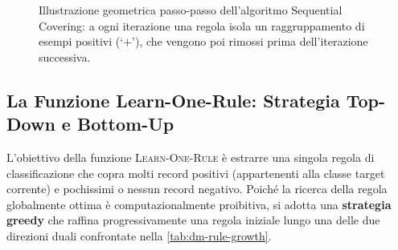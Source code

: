 \begin{figure}[H]
{%
}
\caption{Illustrazione geometrica passo-passo dell'algoritmo Sequential Covering: a ogni iterazione una regola isola un raggruppamento di esempi positivi (`$+$'), che vengono poi rimossi prima dell'iterazione successiva.}
\label{fig:dm-seq-covering}
\end{figure}

\FloatBarrier
\subsection{La Funzione Learn-One-Rule: Strategia Top-Down e Bottom-Up}
\label{subsec:dm-learn-one-rule}

L'obiettivo della funzione \textsc{Learn-One-Rule} \`e estrarre una singola regola di classificazione che copra molti record positivi (appartenenti alla classe target corrente) e pochissimi o nessun record negativo. Poich\'e la ricerca della regola globalmente ottima \`e computazionalmente proibitiva, si adotta una \textbf{strategia greedy} che raffina progressivamente una regola iniziale lungo una delle due direzioni duali confrontate nella \autoref{tab:dm-rule-growth}.


